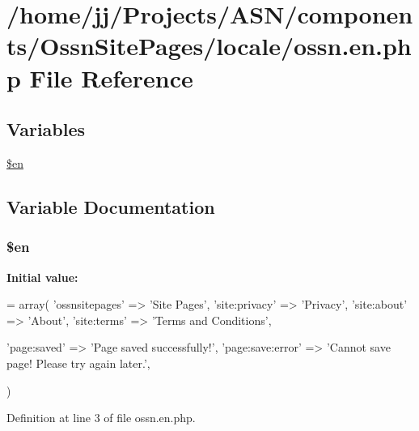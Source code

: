 \hypertarget{components_2_ossn_site_pages_2locale_2ossn_8en_8php}{}\section{/home/jj/\+Projects/\+A\+S\+N/components/\+Ossn\+Site\+Pages/locale/ossn.en.\+php File Reference}
\label{components_2_ossn_site_pages_2locale_2ossn_8en_8php}
\subsection*{Variables}
\begin{DoxyCompactItemize}
\item 
\hyperlink{components_2_ossn_site_pages_2locale_2ossn_8en_8php_a48abc714dfb71c8fffa83cf49f452115}{\$en}
\end{DoxyCompactItemize}


\subsection{Variable Documentation}
\subsubsection[{\texorpdfstring{\$en}{$en}}]{\setlength{\rightskip}{0pt plus 5cm}\$en}\hypertarget{components_2_ossn_site_pages_2locale_2ossn_8en_8php_a48abc714dfb71c8fffa83cf49f452115}{}\label{components_2_ossn_site_pages_2locale_2ossn_8en_8php_a48abc714dfb71c8fffa83cf49f452115}
{\bfseries Initial value\+:}
\begin{DoxyCode}
= array(
    \textcolor{stringliteral}{'ossnsitepages'} => \textcolor{stringliteral}{'Site Pages'},
    \textcolor{stringliteral}{'site:privacy'} => \textcolor{stringliteral}{'Privacy'},
    \textcolor{stringliteral}{'site:about'} => \textcolor{stringliteral}{'About'},
    \textcolor{stringliteral}{'site:terms'} => \textcolor{stringliteral}{'Terms and Conditions'},

    \textcolor{stringliteral}{'page:saved'} => \textcolor{stringliteral}{'Page saved successfully!'},
    \textcolor{stringliteral}{'page:save:error'} => \textcolor{stringliteral}{'Cannot save page! Please try again later.'},

)
\end{DoxyCode}


Definition at line 3 of file ossn.\+en.\+php.

